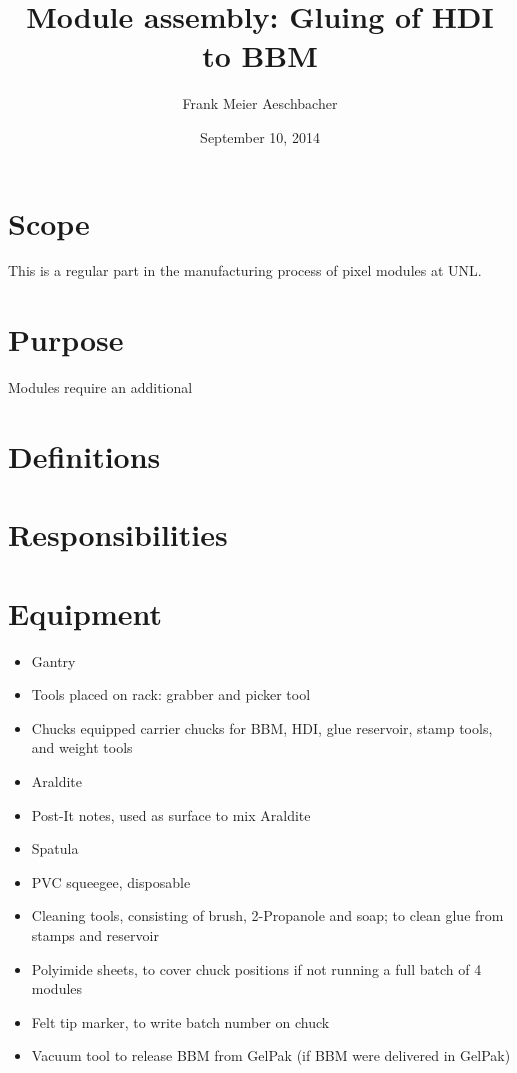 \documentclass[12pt]{unlsilabsop}
\title{Module assembly: Gluing of HDI to BBM}
\date{September 10, 2014}
\author{Frank Meier Aeschbacher}
\begin{document}
\maketitle

\section{Scope}
This is a regular part in the manufacturing process of pixel modules at UNL.

\section{Purpose}
Modules require an additional

\section{Definitions}

\section{Responsibilities}

\section{Equipment}

\begin{itemize}
    \item Gantry
    \item Tools placed on rack: grabber and picker tool
    \item Chucks equipped carrier chucks for BBM, HDI, glue reservoir, stamp tools, and weight tools
    \item Araldite
    \item Post-It notes, used as surface to mix Araldite
    \item Spatula
    \item PVC squeegee, disposable
    \item Cleaning tools, consisting of brush, 2-Propanole and soap; to clean glue from stamps and reservoir
    \item Polyimide sheets, to cover chuck positions if not running a full batch of 4 modules
    \item Felt tip marker, to write batch number on chuck
    \item Vacuum tool to release BBM from GelPak (if BBM were delivered in GelPak)
\end{itemize}
\end{document}
